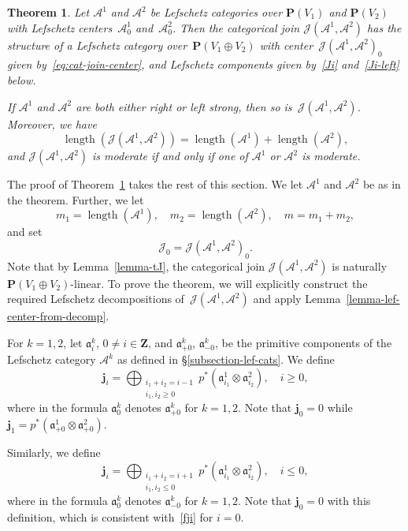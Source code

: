 \documentclass[11pt, reqno]{amsart}
\numberwithin{equation}{section}
\theoremstyle{plain}
\newtheorem{theorem}{Theorem}[section]
\theoremstyle{definition}
\DeclareMathOperator{\length}{\mathrm{length}}
\newcommand{\sotimes}{\otimes}
\newcommand{\cA}{\mathcal{A}}
\newcommand{\cJ}{\mathcal{J}}
\newcommand{\fa}{\mathfrak{a}}
\newcommand{\fj}{\mathbf{j}}
\newcommand{\bZ}{\mathbf{Z}}
\newcommand{\bP}{\mathbf{P}}
\begin{document}
\begin{theorem} 
\label{theorem-join-lef-cat}
Let $\cA^1$ and $\cA^2$ be Lefschetz categories over $\bP(V_1)$ and $\bP(V_2)$ with Lefschetz centers~$\cA^1_0$ and~$\cA^2_0$. 
Then the categorical join $\cJ(\cA^1, \cA^2)$ has the structure of a Lefschetz category over~$\bP(V_1 \oplus V_2)$ 
with center~$\cJ(\cA^1, \cA^2)_0$ given by~\eqref{eq:cat-join-center}, 
and Lefschetz components given by~\eqref{Ji} and~\eqref{Ji-left} below. 

If $\cA^1$ and $\cA^2$ are both either right or left strong, then so is~$\cJ(\cA^1, \cA^2)$. 
Moreover, we have 
\begin{equation*}
\length(\cJ(\cA^1, \cA^2)) = \length(\cA^1) + \length(\cA^2), 
\end{equation*}
and $\cJ(\cA^1, \cA^2)$ is moderate if and only if one of $\cA^1$ or $\cA^2$ is moderate. 
\end{theorem}

The proof of Theorem~\ref{theorem-join-lef-cat} takes the rest of this section. 
We let $\cA^1$ and $\cA^2$ be as in the theorem. 
Further, we let 
\begin{equation*}
m_1 = \length(\cA^1), \quad m_2 = \length(\cA^2), \quad m = m_1 + m_2, 
\end{equation*}
and set 
\begin{equation*}
\cJ_0 =  \cJ(\cA^1, \cA^2)_0. 
\end{equation*}
Note that by Lemma~\ref{lemma-tJ}, the categorical join $\cJ(\cA^1, \cA^2)$ is naturally  
$\bP(V_1 \oplus V_2)$-linear. 
To prove the theorem, we will explicitly construct 
the required Lefschetz decompositions of~$\cJ(\cA^1, \cA^2)$ and apply Lemma~\ref{lemma-lef-center-from-decomp}.

For $k = 1,2$, 
let $\fa^k_i$, $0 \neq i \in \bZ$, and $\fa^{k}_{+0}$, $\fa^{k}_{-0}$, be the primitive components of the 
Lefschetz category $\cA^k$ as defined in \S\ref{subsection-lef-cats}. 
We define 
\begin{equation}
\label{fji} 
\fj_i 
= 
\bigoplus_{\substack{i_1 + i_2 = i - 1 \\ i_1, i_2 \geq 0}} p^*{\left(\fa^1_{i_1} \sotimes \fa^2_{i_2} \right)} , \quad i \geq 0, 
\end{equation} 
where in the formula $\fa^k_0$ denotes $\fa^{k}_{+0}$ for $k=1,2$. 
Note that $\fj_0 = 0$ while $\fj_1 = {p^*(\fa^1_{+0} \sotimes \fa^2_{+0})}$.

Similarly, we define
\begin{equation}
\label{fji-left} 
\fj_i  = 
\bigoplus_{\substack{i_1 + i_2 = i + 1 \\ i_1, i_2 \leq 0}} p^*{\left(\fa^1_{i_1} \sotimes \fa^2_{i_2} \right)} , \quad i \leq 0 , 
\end{equation} 
where in the formula $\fa^k_0$ denotes $\fa^{k}_{-0}$ for $k=1,2$. 
Note that $\fj_0 = 0$ with this definition, which is consistent with~\eqref{fji} for $i = 0$. 
\end{document}
